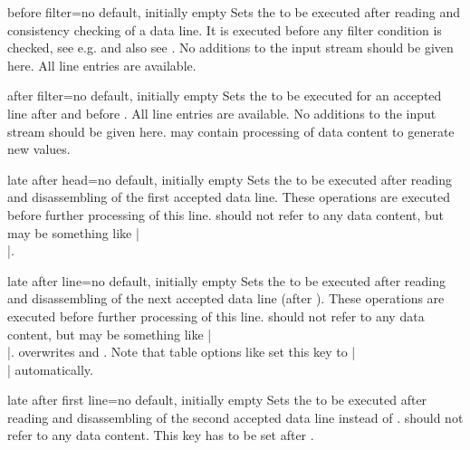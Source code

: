 \documentclass[a4paper,11pt]{ltxdoc}
\begin{document}
\begin{docCsvKey}{before filter}{=}{no default, initially empty}
  Sets the  to be executed after reading and consistency checking
  of a data line. It is executed before any filter condition is checked,
  see e.g.  and
  also see .
  No additions to the input stream should be given here.
  All line entries are available.
\end{docCsvKey}

\begin{docCsvKey}[][doc new=2021-07-06]{after filter}{=}{no default, initially empty}
  Sets the  to be executed for an accepted line after
   and before .
  All line entries are available.
  No additions to the input stream should be given here.  may
  contain processing of data content to generate new values.
\end{docCsvKey}

\begin{docCsvKey}{late after head}{=}{no default, initially empty}
  Sets the  to be executed after reading and disassembling
  of the first accepted data line.
  These operations are executed before further processing of this line.
   should not refer to any data content, but may be something
  like |\\|.
\end{docCsvKey}

\begin{docCsvKey}{late after line}{=}{no default, initially empty}
  Sets the  to be executed after reading and disassembling
  of the next accepted data line (after ).
  These operations are executed before further processing of this line.
   should not refer to any data content, but may be something
  like |\\|.
   overwrites
   and
  .
  Note that table options like  set this key to |\\|
  automatically.
\end{docCsvKey}


\begin{docCsvKey}{late after first line}{=}{no default, initially empty}
  Sets the  to be executed after reading and disassembling
  of the second accepted data line instead of .
   should not refer to any data content.
  This key has to be set after .
\end{docCsvKey}
\end{document}
